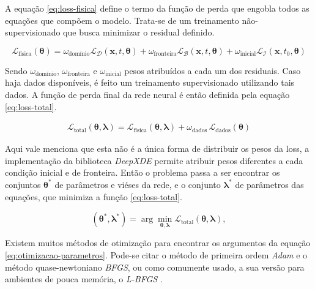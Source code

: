 A equação \ref{eq:loss-fisica} define o termo da função de perda que engobla
todos as equações que compõem o modelo. Trata-se de um treinamento 
não-supervisionado que busca minimizar o residual definido.

\begin{equation}\label{eq:loss-fisica}
    \mathcal{L}_{\text{física}}(\boldsymbol{\theta}) 
    = \omega_{\text{domínio}} \mathcal{L}_{\mathcal{D}}(\boldsymbol{x},t,\boldsymbol{\theta}) 
    + \omega_{\text{fronteira}} \mathcal{L}_{\mathcal{B}}(\boldsymbol{x},t,\boldsymbol{\theta}) 
    + \omega_{\text{inicial}} \mathcal{L}_{\mathcal{I}}(\boldsymbol{x},t_0,\boldsymbol{\theta}) 
\end{equation}

Sendo $\omega_{\text{domínio}}$, $\omega_{\text{fronteira}}$ 
e $\omega_{\text{inicial}}$ pesos atribuídos a cada um dos residuais.
Caso haja dados disponíveis, é feito um treinamento supervisionado utilizando 
tais dados. A função de perda final da rede neural é então definida pela equação
\ref{eq:loss-total}.

\begin{eqnarray}\label{eq:loss-total} 
    \mathcal{L}_{\text{total}}(\boldsymbol{\theta}, \boldsymbol{\lambda}) 
    = \mathcal{L}_{\text{física}}(\boldsymbol{\theta}, \boldsymbol{\lambda}) 
    + \omega_{\text{dados}} \,\mathcal{L}_{\text{dados}}(\boldsymbol{\theta})
\end{eqnarray}

Aqui vale menciona que esta não é a única forma de distribuir os pesos da loss,
a implementação da biblioteca \textit{DeepXDE} \cite{lu-etal:21-deepxde}
permite atribuir pesos diferentes a cada condição inicial e de fronteira. 
Então o problema passa a ser encontrar os conjuntos $\boldsymbol{\theta}^*$ de 
parâmetros e viéses da rede, e o conjunto $\boldsymbol{\lambda}^*$ de parâmetros
das equações, que minimiza a função \ref{eq:loss-total}.

\begin{equation}\label{eq:otimizacao-parametros}
   (\boldsymbol{\theta}^*, \boldsymbol{\lambda}^*) 
   = \arg \min_{\boldsymbol{\theta}, \boldsymbol{\lambda}} \mathcal{L}_{\text{total}}(\boldsymbol{\theta}, \boldsymbol{\lambda}), 
\end{equation}

Existem muitos métodos de otimização para encontrar os argumentos 
da equação \ref{eq:otimizacao-parametros}. Pode-se citar o método de 
primeira ordem \textit{Adam} \cite{kingma-ba:14-adam} e o método quase-newtoniano
\textit{BFGS}, ou como comumente usado, a sua versão para ambientes de pouca
memória, o \textit{L-BFGS} \cite{liu-nocedal:89-lbfgs}.

